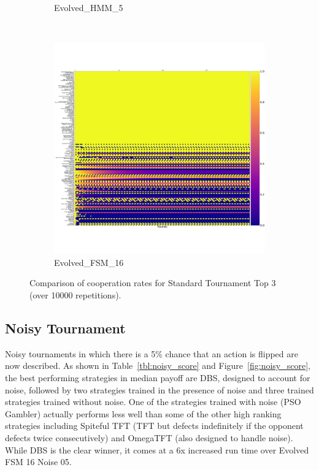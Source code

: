 \documentclass{article}
\begin{document}
\begin{figure}[!hbtp]
\begin{subfigure}[t]{.3\textwidth}
        \caption{Evolved\_HMM\_5}
    \end{subfigure}%
    ~
    \begin{subfigure}[t]{.3\textwidth}
        \centering
        \includegraphics[width=\textwidth]{./assets/cooperation_0_0_10000_Evolved_FSM_16_array.pdf}
        \caption{Evolved\_FSM\_16}
    \end{subfigure}%

    \caption{Comparison of cooperation rates for Standard Tournament Top 3
    (over 10000 repetitions).}
    \label{fig:comparison_cooperation_heatmaps_standard}
\end{figure}

\subsection{Noisy Tournament}\label{sec:noise}

Noisy tournaments in which there is a 5\% chance that an action is
flipped are now described. As shown in Table~\ref{tbl:noisy_score} and
Figure~\ref{fig:noisy_score}, the best performing strategies in median payoff
are DBS, designed to account for noise, followed by two strategies trained in
the presence of noise and three trained strategies trained without noise. One of
the strategies trained with noise (PSO Gambler) actually performs less well than
some of the other high ranking strategies including
Spiteful TFT (TFT but defects indefinitely if the opponent defects twice
consecutively) and OmegaTFT (also designed to handle noise). While DBS is the clear
winner, it comes at a 6x increased run time over Evolved FSM 16 Noise 05.
\end{document}
